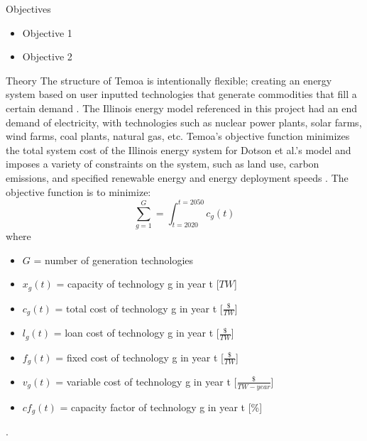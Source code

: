 \documentclass[final]{beamer}
\newlength{\onecolwid}
\newlength{\threecolwid}
\begin{document}
\begin{frame}[t]
\begin{columns}[t,totalwidth=\threecolwid]
\begin{column}{\onecolwid}

\begin{alertblock}{Objectives}
\begin{itemize}
        \item Objective 1
	\item Objective 2
\end{itemize}

\end{alertblock}


\begin{block}{Theory}
The structure of Temoa is intentionally flexible; creating an energy system based on user inputted technologies that generate commodities that fill a certain demand \cite{decarolis}. The Illinois energy model referenced in this project had an end demand of electricity, with technologies such as nuclear power plants, solar farms, wind farms, coal plants, natural gas, etc. Temoa’s objective function minimizes the total system cost of the Illinois energy system for Dotson et al.’s model and imposes a variety of constraints on the system, such as land use, carbon emissions, and specified renewable energy and energy deployment speeds \cite{dotson}. The objective function is to minimize:
	\begin{equation} \label{eq:objective}
	  \sum_{g=1}^{G} = \int_{t=2020}^{t=2050}c_g(t)
	\end{equation} where \newline
	\begin{itemize}
	  \item $G$ = number of generation technologies
	  \item $x_g(t)$ = capacity of technology g in year t [$TW$]
	  \item $c_g(t)$ = total cost of technology g in year t [$\frac{\$}{TW}$]
	  \item $l_g(t)$ = loan cost of technology g in year t [$\frac{\$}{TW}$]
	  \item $f_g(t)$ = fixed cost of technology g in year t [$\frac{\$}{TW}$]
	  \item $v_g(t)$ = variable cost of technology g in year t [$\frac{\$}{TW-year}$]
	  \item $cf_g(t)$ = capacity factor of technology g in year t [\%]
	\end{itemize} \cite{dotson}.
	

\end{block}
\end{column}
\end{columns}
\end{frame}
\end{document}
